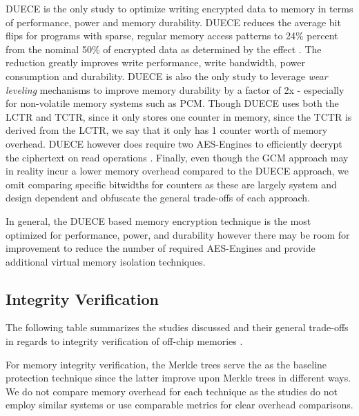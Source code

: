 DUECE \cite{duece} is the only study to optimize writing encrypted data to
memory in terms of performance, power and memory durability. DUECE reduces the
average bit flips for programs with sparse, regular memory access patterns to
24\% percent from the nominal 50\% of encrypted data as determined by the
 effect \cite{avalance}. The reduction greatly improves write
performance, write bandwidth, power consumption and durability. DUECE is also
the only study to leverage \textit{wear leveling} mechanisms to improve memory
durability by a factor of 2x - especially for non-volatile memory systems such
as PCM. Though DUECE uses both the LCTR and TCTR, since it only stores one
counter in memory, since the TCTR is derived from the LCTR, we say that it only
has 1 counter worth of memory overhead. DUECE however does require two
AES-Engines to efficiently decrypt the ciphertext on read operations
\cite{duece}. Finally, even though the GCM approach may in reality incur a
lower memory overhead compared to the DUECE approach, we omit comparing
specific bitwidths for counters as these are largely system and design
dependent and obfuscate the general trade-offs of each approach.

In general, the DUECE based memory encryption technique is the most optimized
for performance, power, and durability however there may be room for
improvement to reduce the number of required AES-Engines and provide additional
virtual memory isolation techniques.

\subsection{Integrity Verification}
The following table summarizes the studies discussed and their general
trade-offs in regards to integrity verification of off-chip memories
\cite{patTree} \cite{merkle}  \cite{multicoreEnc} \cite{suh-memIntEnc}
\cite{aegis} \cite{gcmMem}.

For memory integrity verification, the Merkle trees \cite{merkle} serve the as
the baseline protection technique since the latter improve upon Merkle trees in
different ways.  We do not compare memory overhead for each technique as the
studies do not employ similar systems or use comparable metrics for clear
overhead comparisons.

